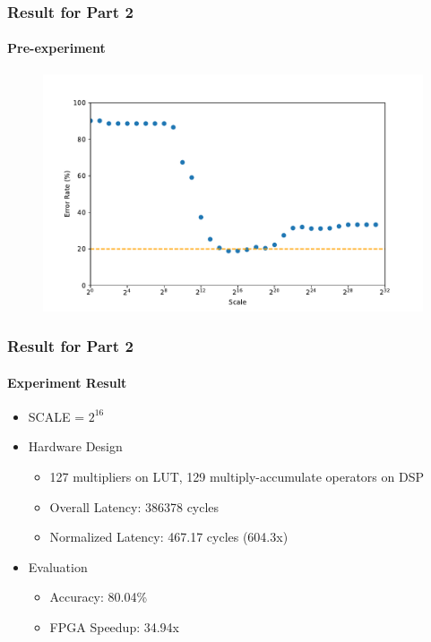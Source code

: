 \documentclass[aspectratio=169]{beamer}
\begin{document}
\begin{frame}
    \frametitle{Result for Part 2}
    \framesubtitle{Pre-experiment}

    \begin{figure}
        \centering
        \includegraphics[scale=0.48]{images/scale_pretest.pdf}
    \end{figure}

\end{frame}

\begin{frame}
    \frametitle{Result for Part 2}
    \framesubtitle{Experiment Result}

    \begin{itemize}
        \item SCALE = \(2^{16}\)
        \item Hardware Design
              \begin{itemize}
                  \item 127 multipliers on LUT, 129 multiply-accumulate operators on DSP
                  \item Overall Latency: 386378 cycles
                  \item Normalized Latency: 467.17 cycles (604.3x)
              \end{itemize}
        \item Evaluation
              \begin{itemize}
                  \item Accuracy: 80.04\%
                  \item FPGA Speedup: 34.94x
              \end{itemize}
    \end{itemize}
\end{frame}
\end{document}
